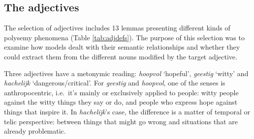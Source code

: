 \documentclass[
]{book}
\begin{document}
\hypertarget{adjs}{%
\subsection{The adjectives}\label{adjs}}

The selection of adjectives includes 13 lemmas presenting different kinds of polysemy phenomena (Table \ref{tab:adjdefs}). The purpose of this selection was to examine how models dealt with their semantic relationships and whether they could extract them from the different nouns modified by the target adjective.

Three adjectives have a metonymic reading: \emph{hoopvol} `hopeful', \emph{geestig} `witty' and \emph{hachelijk} `dangerous/critical'.
For \emph{geestig} and \emph{hoopvol}, one of the senses is anthropocentric, i.e.~it's mainly or exclusively applied to people: witty people against the witty things they say or do, and people who express hope against things that inspire it.
In \emph{hachelijk}'s case, the difference is a matter of temporal or telic perspective: between things that might go wrong and situations that are already problematic.



\begingroup\fontsize{7}{9}\selectfont
\end{document}
